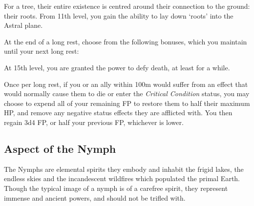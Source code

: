 {
	For a tree, their entire existence is centred around their connection to the ground: their roots. From 11th level, you gain the ability to lay down `roots' into the Astral plane.
	
	At the end of a long rest, choose from the following bonuses, which you maintain until your next long rest:
	\begin{itemize}[itemsep=0em]
	\end{itemize}
}


{
	At 15th level, you are granted the power to defy death, at least for a while. 
	
	Once per long rest, if you or an ally within 100m would suffer from an effect that would normally cause them to die or enter the {\it Critical Condition} status, you may choose to expend all of your remaining FP to restore them to half their maximum HP, and remove any negative status effects they are afflicted with. You then regain 3d4 FP, or half your previous FP, whichever is lower. 
}

\subsection{Aspect of the Nymph}

The Nymphs are elemental spirits \minus{} they embody and inhabit the frigid lakes, the endless skies and the incandescent wildfires which populated the primal Earth. Though the typical image of a nymph is of a carefree spirit, they represent immense and ancient powers, and should not be trifled with.  

